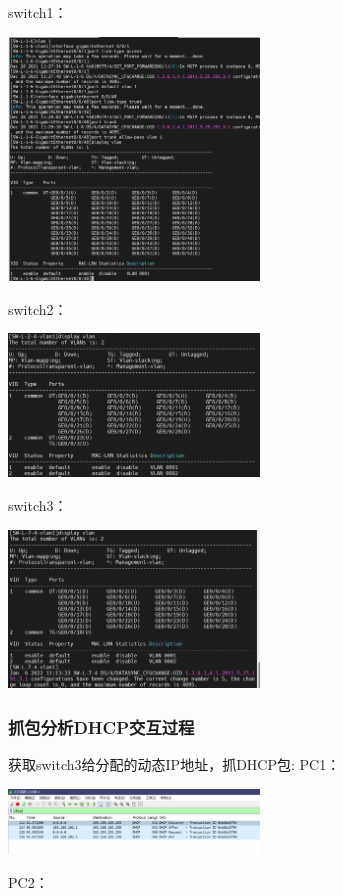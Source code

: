 \documentclass{article}
\begin{document}
switch1：

\vspace{10pt}
\centerline{\includegraphics[width=0.5\textwidth]{3_1_images/1.png}}
\vspace{10pt}
switch2：

\vspace{10pt}
\centerline{\includegraphics[width=0.5\textwidth]{3_1_images/2.png}}
\vspace{10pt}
switch3：

\vspace{10pt}
\centerline{\includegraphics[width=0.5\textwidth]{3_1_images/3.png}}
\vspace{10pt}

\subsubsection{抓包分析DHCP交互过程}
获取switch3给分配的动态IP地址，抓DHCP包:
PC1：

\vspace{10pt}
\centerline{\includegraphics[width=0.5\textwidth]{3_1_images/4.png}}
\vspace{10pt}
PC2：
\end{document}
